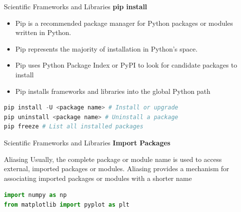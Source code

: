 \documentclass{beamer}
\begin{document}
    \begin{frame}[fragile]{Scientific Frameworks and Libraries}
        \textbf{pip install}
        \begin{itemize}
            \item Pip is a recommended package manager for Python packages or modules written in Python.
            \item Pip represents the majority of installation in Python's space.
            \item Pip uses Python Package Index or PyPI to look for candidate packages to install
            \item Pip installs frameworks and libraries into the global Python path
        \end{itemize}
        \begin{example}
            \begin{lstlisting}[language=Python]
pip install -U <package name> # Install or upgrade
pip uninstall <package name> # Uninstall a package
pip freeze # List all installed packages
            \end{lstlisting}
        \end{example}
    \end{frame}

    \begin{frame}[fragile]{Scientific Frameworks and Libraries}
        \textbf{Import Packages}
        \begin{block}{Aliasing}
            Usually, the complete package or module name is used to access external, imported packages or modules. Aliasing provides a mechanism for associating imported packages or modules with a shorter name
        \end{block}
        \begin{example}
            \lstinline[language=Python]{import numpy as np} \\
            \lstinline[language=Python]{from matplotlib import pyplot as plt}
        \end{example}
    \end{frame}
\end{document}
